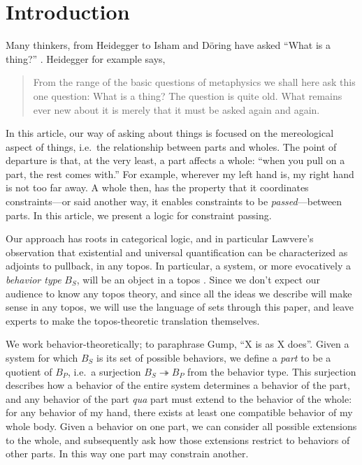 
\section{Introduction}

Many thinkers, from Heidegger to Isham and D\"{o}ring have asked ``What is a thing?'' \cite{heidegger1972thing, doring2010thing}. Heidegger for example says,
\begin{quote}
    From the range of the basic questions of metaphysics we shall here ask this one question: What is a thing? The question is quite old. What remains ever new about it is merely that it must be asked again and again.
\end{quote}
In this article, our way of asking about things is focused on the mereological aspect of things, i.e.\ the relationship between parts and wholes. The point of departure is that, at the very least, a part affects a whole: ``when you pull on a part, the rest comes with.'' For example, wherever my left hand is, my right hand is not too far away. A whole then, has the property that it coordinates constraints---or said another way, it enables constraints to be \emph{passed}---between parts. In this article, we present a logic for constraint passing.

Our approach has roots in categorical logic, and in particular Lawvere's observation that existential and universal quantification can be characterized as adjoints to pullback, in any topos. In particular, a system, or more evocatively a \emph{behavior type} $B_S$, will be an object in a topos \cite{MacLane.Moerdijk:1992a}. Since we don't expect our audience to know any topos theory, and since all the ideas we describe will make sense in any topos, we will use the language of sets through this paper, and leave experts to make the topos-theoretic translation themselves.

We work behavior-theoretically; to paraphrase Gump, ``X is as X does''. Given a system for which $B_S$ is its set of possible behaviors, we define a \emph{part} to be a quotient of $B_P$, i.e.\ a surjection $B_S \twoheadrightarrow B_P$ from the behavior type. This surjection describes how a behavior of the entire system determines a behavior of the part, and any behavior of the part \emph{qua} part must extend to the behavior of the whole: for any behavior of my hand, there exists at least one compatible behavior of my whole body. Given a behavior on one part, we can consider all possible extensions to the whole, and subsequently ask how those extensions restrict to behaviors of other parts. In this way one part may constrain another.

